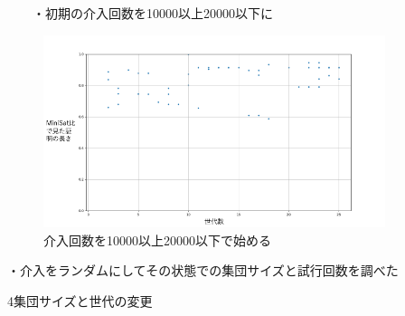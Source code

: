 　　・初期の介入回数を10000以上20000以下に

\begin{figure}[h]
    \centering
    \includegraphics[width=10cm]{figures/Experiment1/3-2.png}
    \caption{介入回数を10000以上20000以下で始める}
\end{figure}

・介入をランダムにしてその状態での集団サイズと試行回数を調べた

4集団サイズと世代の変更

